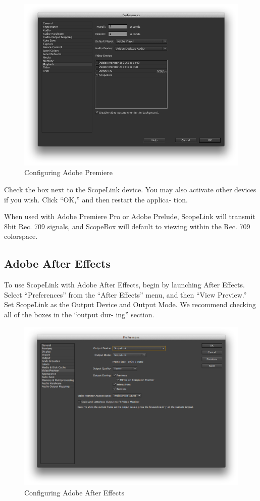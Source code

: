 \documentclass[10,letterpaper,]{report}
\begin{document}
\begin{figure}[htbp]
\centering
\includegraphics{images/PremierePreferences.png}
\caption{Configuring Adobe Premiere}
\end{figure}

Check the box next to the ScopeLink device. You may also activate other
devices if you wish. Click ``OK,'' and then restart the applica- tion.

When used with Adobe Premiere Pro or Adobe Prelude, ScopeLink will
transmit 8bit Rec. 709 signals, and ScopeBox will default to viewing
within the Rec. 709 colorspace.

\subsection{Adobe After Effects}

To use ScopeLink with Adobe After Effects, begin by launching After
Effects. Select ``Preferences'' from the ``After Effects'' menu, and
then ``View Preview.'' Set ScopeLink as the Output Device and Output
Mode. We recommend checking all of the boxes in the ``output dur- ing''
section.

\begin{figure}[htbp]
\centering
\includegraphics{images/AfterEffects.png}
\caption{Configuring Adobe After Effects}
\end{figure}
\end{document}
